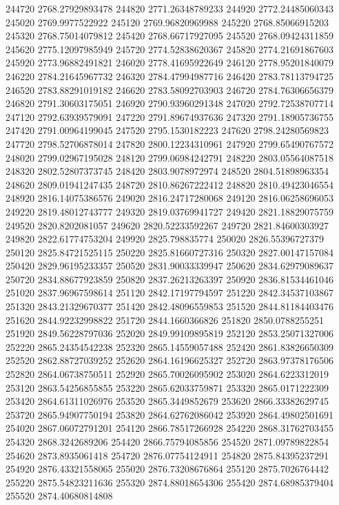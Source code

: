{244720 2768.27929893478
244820 2771.26348789233
244920 2772.24485060343
245020 2769.9977522922
245120 2769.96820969988
245220 2768.85066915203
245320 2768.75014079812
245420 2768.66717927095
245520 2768.09424311859
245620 2775.12097985949
245720 2774.52838620367
245820 2774.21691867603
245920 2773.96882491821
246020 2778.41695922649
246120 2778.95201840079
246220 2784.21645967732
246320 2784.47994987716
246420 2783.78113794725
246520 2783.88291019182
246620 2783.58092703903
246720 2784.76306656379
246820 2791.30603175051
246920 2790.93960291348
247020 2792.72538707714
247120 2792.63939579091
247220 2791.89674937636
247320 2791.18905736755
247420 2791.00964199045
247520 2795.1530182223
247620 2798.24280569823
247720 2798.52706878014
247820 2800.12234310961
247920 2799.65490767572
248020 2799.02967195028
248120 2799.06984242791
248220 2803.05564087518
248320 2802.52807373745
248420 2803.9078972974
248520 2804.51898963354
248620 2809.01941247435
248720 2810.86267222412
248820 2810.49423046554
248920 2816.14075386576
249020 2816.24717280068
249120 2816.06258696053
249220 2819.48012743777
249320 2819.03769941727
249420 2821.18829075759
249520 2820.8202081057
249620 2820.52233592267
249720 2821.84600303927
249820 2822.61774753204
249920 2825.798835774
250020 2826.55396727379
250120 2825.84721525115
250220 2825.81660727316
250320 2827.00147157084
250420 2829.96195233357
250520 2831.90033339947
250620 2834.62979089637
250720 2834.88677923859
250820 2837.26213263397
250920 2836.81534461046
251020 2837.96967598614
251120 2842.17197794597
251220 2842.34537103867
251320 2843.21329670377
251420 2842.48096559853
251520 2844.81184403476
251620 2844.92232998822
251720 2844.1660366826
251820 2850.0788255251
251920 2849.56228797036
252020 2849.99109895819
252120 2853.25071327006
252220 2865.24354542238
252320 2865.14559057488
252420 2861.83826650309
252520 2862.88727039252
252620 2864.16196625327
252720 2863.97378176506
252820 2864.06738750511
252920 2865.70026095902
253020 2864.6223312019
253120 2863.54256855855
253220 2865.62033759871
253320 2865.0171222309
253420 2864.61311026976
253520 2865.3449852679
253620 2866.33382629745
253720 2865.94907750194
253820 2864.62762086042
253920 2864.49802501691
254020 2867.06072791201
254120 2866.78517266928
254220 2868.31762703455
254320 2868.3242689206
254420 2866.75794085856
254520 2871.09789822854
254620 2873.8935061418
254720 2876.07754124911
254820 2875.84395237291
254920 2876.43321558065
255020 2876.73208676864
255120 2875.7026764442
255220 2875.54823211636
255320 2874.88018654306
255420 2874.68985379404
255520 2874.40680814808
}
